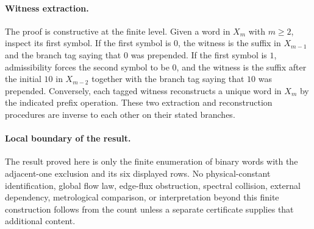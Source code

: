\paragraph{Witness extraction.}
The proof is constructive at the finite level. Given a word in $X_m$ with $m\geq 2$, inspect its first symbol. If the first symbol is $0$, the witness is the suffix in $X_{m-1}$ and the branch tag saying that $0$ was prepended. If the first symbol is $1$, admissibility forces the second symbol to be $0$, and the witness is the suffix after the initial $10$ in $X_{m-2}$ together with the branch tag saying that $10$ was prepended. Conversely, each tagged witness reconstructs a unique word in $X_m$ by the indicated prefix operation. These two extraction and reconstruction procedures are inverse to each other on their stated branches.

\paragraph{Local boundary of the result.}
The result proved here is only the finite enumeration of binary words with the adjacent-one exclusion and its six displayed rows. No physical-constant identification, global flow law, edge-flux obstruction, spectral collision, external dependency, metrological comparison, or interpretation beyond this finite construction follows from the count unless a separate certificate supplies that additional content.
